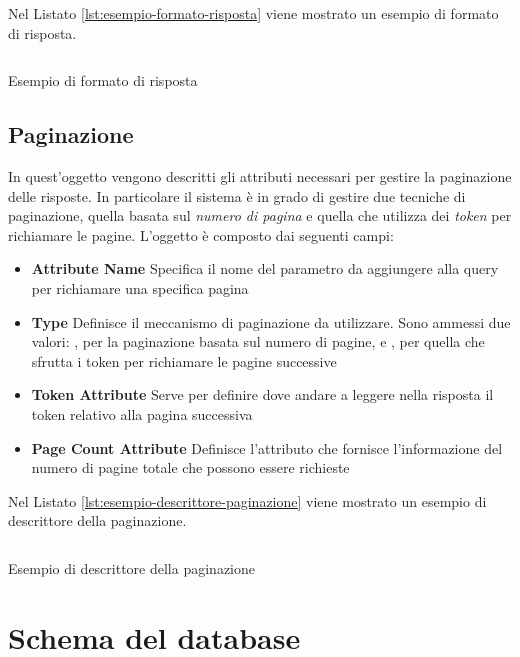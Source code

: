 Nel Listato \ref{lst:esempio-formato-risposta} viene mostrato un esempio di formato di risposta.

\begin{listing}[H]
	\inputminted{json}{5-implementazione-backend/Codice/esempio_formato_risposta.json}
	\caption{Esempio di formato di risposta}
	\label{lst:esempio-formato-risposta}
\end{listing}

\subsection{Paginazione\label{sec:descrittore-paginazione}}

In quest'oggetto vengono descritti gli attributi necessari per gestire la paginazione delle risposte. In particolare il sistema è in grado di gestire due tecniche di paginazione, quella basata sul \emph{numero di pagina} e quella che utilizza dei \emph{token} per richiamare le pagine. L'oggetto è composto dai seguenti campi:

\begin{itemize}
	\item \textbf{Attribute Name} Specifica il nome del parametro da aggiungere alla query per richiamare una specifica pagina
	\item \textbf{Type} Definisce il meccanismo di paginazione da utilizzare. Sono ammessi due valori: , per la paginazione basata sul numero di pagine, e , per quella che sfrutta i token per richiamare le pagine successive
	\item \textbf{Token Attribute} Serve per definire dove andare a leggere nella risposta il token relativo alla pagina successiva
	\item \textbf{Page Count Attribute} Definisce l'attributo che fornisce l'informazione del numero di pagine totale che possono essere richieste
\end{itemize}

Nel Listato \ref{lst:esempio-descrittore-paginazione} viene mostrato un esempio di descrittore della paginazione.

\begin{listing}[H]
	\inputminted{json}{5-implementazione-backend/Codice/esempio_descrittore_paginazione.json}
	\caption{Esempio di descrittore della paginazione}
	\label{lst:esempio-descrittore-paginazione}
\end{listing}

\section{Schema del database\label{sec:schema-database}}

